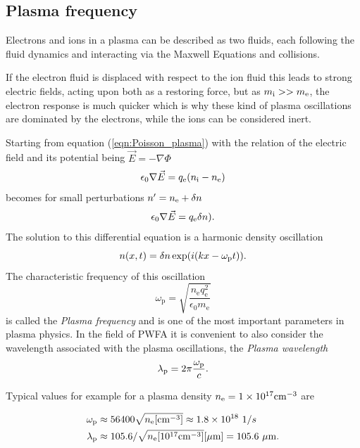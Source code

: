 \subsection*{Plasma frequency}
Electrons and ions in a plasma can be described as two fluids, each following the fluid dynamics and interacting via the Maxwell Equations and collisions.

If the electron fluid is displaced with respect to the ion fluid this leads to strong electric fields, acting upon both as a restoring force, but as $m_\mathrm{i}>>m_\mathrm{e}$, the electron response is much quicker which is why these kind of plasma oscillations are dominated by the electrons, while the ions can be considered inert.

Starting from equation (\ref{eqn:Poisson_plasma}) with the relation of the electric field and its potential being $\vec{E}=-\nabla \Phi$ 
\begin{equation}
\epsilon_0 \nabla \vec{E}=q_\mathrm{e} (n_\mathrm{i}-n_\mathrm{e})
\end{equation}
becomes for small perturbations $n'=n_\mathrm{e}+\delta n$
\begin{equation}
\epsilon_0 \nabla \vec{E}=q_\mathrm{e} \delta n).
\end{equation}
The solution to this differential equation is a harmonic density oscillation 
\begin{equation}
n(x,t)=\delta n \exp(i(kx-\omega_\mathrm{p} t)).
\end{equation}
The characteristic frequency of this oscillation 
\begin{equation}
\omega_\mathrm{p}=\sqrt{\frac{n_\mathrm{e}q_\mathrm{e}^2}{\epsilon_0 m_\mathrm{e}}}
\end{equation}
is called the \textit{Plasma frequency} and is one of the most important parameters in plasma physics. 
In the field of PWFA it is convenient to also consider the wavelength associated with the plasma oscillations, 
the \textit{Plasma wavelength}
\begin{equation}
\lambda_\mathrm{p}=2\pi\frac{\omega_\mathrm{p}}{c}.
\end{equation}

Typical values for example for a plasma density $n_\mathrm{e}=1\times10^{17}\mathrm{cm}^{-3}$ are

\begin{align*}
\omega_\mathrm{p} &\approx 56400 \sqrt{n_\mathrm{e} [\mathrm{cm}^{-3}]} \approx 1.8\times10^{18}\ 1/s\\
\lambda_\mathrm{p} & \approx 105.6 /\sqrt{n_\mathrm{e} [10^{17} \mathrm{cm}^{-3} ]} [\mu\mathrm{m}] = 105.6\ \mu\mathrm{m}.
\end{align*} 




